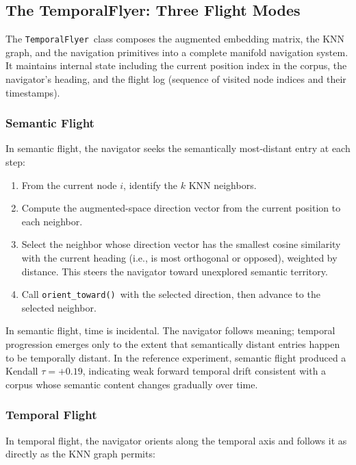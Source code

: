\documentclass[12pt,letterpaper]{article}
\newcommand{\temporalflyer}{\texttt{TemporalFlyer}}
\newcommand{\orienttoward}{\texttt{orient\_toward()}}
\begin{document}
\subsection{The TemporalFlyer: Three Flight Modes}
\label{sec:flyer}

The \temporalflyer\ class composes the augmented embedding matrix, the KNN
graph, and the navigation primitives into a complete manifold navigation
system. It maintains internal state including the current position index in
the corpus, the navigator's heading, and the flight log (sequence of visited
node indices and their timestamps).

\subsubsection{Semantic Flight}

In semantic flight, the navigator seeks the semantically most-distant entry at
each step:

\begin{enumerate}[noitemsep]
  \item From the current node $i$, identify the $k$ KNN neighbors.
  \item Compute the augmented-space direction vector from the current position
    to each neighbor.
  \item Select the neighbor whose direction vector has the smallest cosine
    similarity with the current heading (i.e., is most orthogonal or opposed),
    weighted by distance. This steers the navigator toward unexplored semantic
    territory.
  \item Call \orienttoward\ with the selected direction, then advance to the
    selected neighbor.
\end{enumerate}

In semantic flight, time is incidental. The navigator follows meaning; temporal
progression emerges only to the extent that semantically distant entries happen
to be temporally distant. In the reference experiment, semantic flight produced
a Kendall $\tau = +0.19$, indicating weak forward temporal drift consistent
with a corpus whose semantic content changes gradually over time.

\subsubsection{Temporal Flight}

In temporal flight, the navigator orients along the temporal axis and follows
it as directly as the KNN graph permits:
\end{document}

